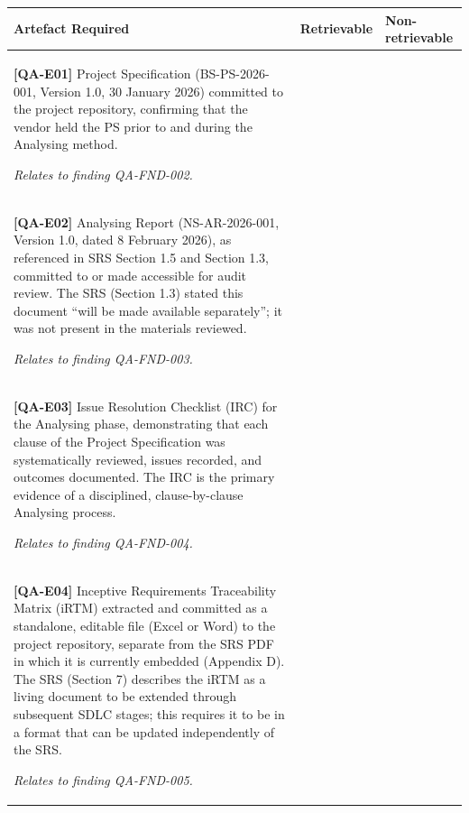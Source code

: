 \documentclass[11pt,a4paper]{article}
\newcommand{\checkbox}{\makebox[1em]{\Square}}
\begin{document}
\vspace{0.3cm}

\renewcommand{\arraystretch}{2.0}
\begin{longtable}{|p{}|p{}|p{}|}
\hline
\rowcolor{tableheader}
\textbf{Artefact Required} & \textbf{Retrievable} & \textbf{Non-retrievable} \\
\hline
\endhead

\rowcolor{medsev}
\small
\textbf{[QA-E01]} Project Specification (BS-PS-2026-001, Version 1.0, 30 January 2026) committed to the project repository, confirming that the vendor held the PS prior to and during the Analysing method.

\textit{Relates to finding QA-FND-002.} &
\centering\checkbox &
\centering\checkbox \tabularnewline
\hline

\rowcolor{medsev}
\small
\textbf{[QA-E02]} Analysing Report (NS-AR-2026-001, Version 1.0, dated 8 February 2026), as referenced in SRS Section 1.5 and Section 1.3, committed to or made accessible for audit review. The SRS (Section 1.3) stated this document ``will be made available separately''; it was not present in the materials reviewed.

\textit{Relates to finding QA-FND-003.} &
\centering\checkbox &
\centering\checkbox \tabularnewline
\hline

\rowcolor{medsev}
\small
\textbf{[QA-E03]} Issue Resolution Checklist (IRC) for the Analysing phase, demonstrating that each clause of the Project Specification was systematically reviewed, issues recorded, and outcomes documented. The IRC is the primary evidence of a disciplined, clause-by-clause Analysing process.

\textit{Relates to finding QA-FND-004.} &
\centering\checkbox &
\centering\checkbox \tabularnewline
\hline

\rowcolor{medsev}
\small
\textbf{[QA-E04]} Inceptive Requirements Traceability Matrix (iRTM) extracted and committed as a standalone, editable file (Excel or Word) to the project repository, separate from the SRS PDF in which it is currently embedded (Appendix D). The SRS (Section 7) describes the iRTM as a living document to be extended through subsequent SDLC stages; this requires it to be in a format that can be updated independently of the SRS.

\textit{Relates to finding QA-FND-005.} &
\centering\checkbox &
\centering\checkbox \tabularnewline
\hline

\end{longtable}
\end{document}
